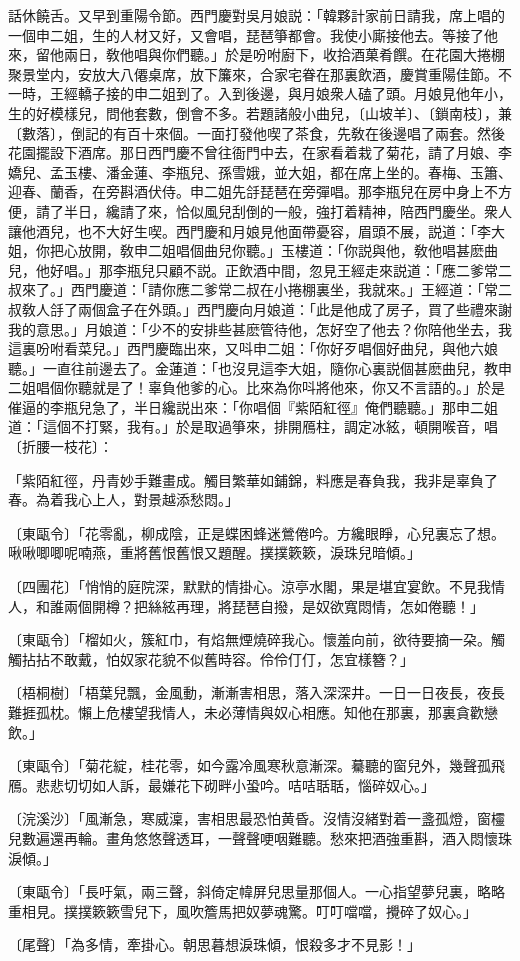 話休饒舌。又早到重陽令節。西門慶對吳月娘説：「韓夥計家前日請我，席上唱的一個申二姐，生的人材又好，又會唱，琵琶箏都會。我使小廝接他去。等接了他來，留他兩日，敎他唱與你們聽。」於是吩咐廚下，收拾酒菓肴饌。在花園大捲棚聚景堂内，安放大八僊桌席，放下簾來，合家宅眷在那裏飲酒，慶賞重陽佳節。不一時，王經轎子接的申二姐到了。入到後邊，與月娘衆人磕了頭。月娘見他年小，生的好模樣兒，問他套數，倒會不多。若題諸般小曲兒，〔山坡羊〕、〔鎖南枝〕，兼〔數落〕，倒記的有百十來個。一面打發他喫了茶食，先敎在後邊唱了兩套。然後花園擺設下酒席。那日西門慶不曾往衙門中去，在家看着栽了菊花，請了月娘、李嬌兒、孟玉樓、潘金蓮、李瓶兒、孫雪娥，並大姐，都在席上坐的。春梅、玉簫、迎春、蘭香，在旁斟酒伏侍。申二姐先㧱琵琶在旁彈唱。那李瓶兒在房中身上不方便，請了半日，纔請了來，恰似風兒刮倒的一般，強打着精神，陪西門慶坐。衆人讓他酒兒，也不大好生喫。西門慶和月娘見他面帶憂容，眉頭不展，説道：「李大姐，你把心放開，敎申二姐唱個曲兒你聽。」玉樓道：「你説與他，敎他唱甚麽曲兒，他好唱。」那李瓶兒只顧不説。正飲酒中間，忽見王經走來説道：「應二爹常二叔來了。」西門慶道：「請你應二爹常二叔在小捲棚裏坐，我就來。」王經道：「常二叔敎人㧱了兩個盒子在外頭。」西門慶向月娘道：「此是他成了房子，買了些禮來謝我的意思。」月娘道：「少不的安排些甚麽管待他，怎好空了他去？你陪他坐去，我這裏吩咐看菜兒。」西門慶臨出來，又呌申二姐：「你好歹唱個好曲兒，與他六娘聽。」一直往前邊去了。金蓮道：「也沒見這李大姐，隨你心裏説個甚麽曲兒，教申二姐唱個你聽就是了！辜負他爹的心。比來為你呌將他來，你又不言語的。」於是催逼的李瓶兒急了，半日纔説出來：「你唱個『紫陌紅徑』俺們聽聽。」那申二姐道：「這個不打緊，我有。」於是取過箏來，排開鴈柱，調定冰絃，頓開喉音，唱〔折腰一枝花〕：

\begin{myquote}
「紫陌紅徑，丹青妙手難畫成。觸目繁華如鋪錦，料應是春負我，我非是辜負了春。為着我心上人，對景越添愁悶。」

{\markfont〔東甌令〕}「花零亂，柳成陰，正是蝶困蜂迷鶯倦吟。方纔眼睜，心兒裏忘了想。啾啾唧唧呢喃燕，重將舊恨舊恨又題醒。撲撲簌簌，淚珠兒暗傾。」

{\markfont〔四團花〕}「悄悄的庭院深，默默的情掛心。涼亭水閣，果是堪宜宴飲。不見我情人，和誰兩個開樽？把絲絃再理，將琵琶自撥，是奴欲寬悶情，怎如倦聽！」

{\markfont〔東甌令〕}「榴如火，簇紅巾，有焰無煙燒碎我心。懷羞向前，欲待要摘一朶。觸觸拈拈不敢戴，怕奴家花貌不似舊時容。伶伶仃仃，怎宜樣簪？」

{\markfont〔梧桐樹〕}「梧葉兒飄，金風動，漸漸害相思，落入深深井。一日一日夜長，夜長難捱孤枕。懶上危樓望我情人，未必薄情與奴心相應。知他在那裏，那裏貪歡戀飲。」

{\markfont〔東甌令〕}「菊花綻，桂花零，如今露冷風寒秋意漸深。驀聽的窗兒外，幾聲孤飛鴈。悲悲切切如人訴，最嫌花下砌畔小蛩吟。咭咭聒聒，惱碎奴心。」

{\markfont〔浣溪沙〕}「風漸急，寒威澟，害相思最恐怕黄昏。沒情沒緒對着一盞孤燈，窗欞兒數遍還再輪。畫角悠悠聲透耳，一聲聲哽咽難聽。愁來把酒強重斟，酒入悶懷珠淚傾。」

{\markfont〔東甌令〕}「長吁氣，兩三聲，斜倚定幃屏兒思量那個人。一心指望夢兒裏，略略重相見。撲撲簌簌雪兒下，風吹簷馬把奴夢魂驚。叮叮噹噹，攪碎了奴心。」

{\markfont〔尾聲〕}「為多情，牽掛心。朝思暮想淚珠傾，恨殺多才不見影！」
\end{myquote}

